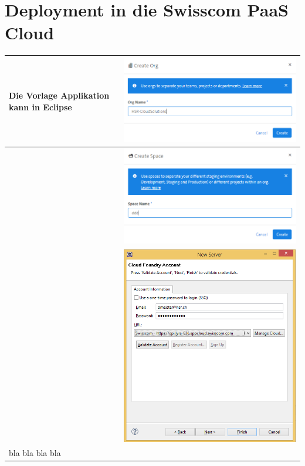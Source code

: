 \section{Deployment in die Swisscom PaaS Cloud}
\begin{longtable}{| p{5cm} | p{11cm} |}
\hline
Die Vorlage Applikation kann in Eclipse 
&\includegraphics[width=0.65\columnwidth, valign=T]{images/swisscom_create_space/1.png}
 \\ \hline
&\includegraphics[width=0.65\columnwidth, valign=T]{images/swisscom_create_space/2.png}
 \\ \hline
&\includegraphics[width=0.65\columnwidth, valign=T]{images/ddd_cloud_deployment/3.png}
 \\ \hline 
bla bla bla bla

\end{longtable}
